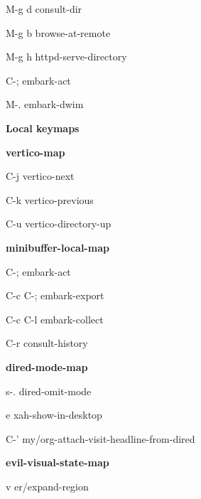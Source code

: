 \documentclass[10pt]{article}
\renewcommand\section[1]{\bigskip\par\textbf{\color{heading}\large#1}\smallskip}
\renewcommand\subsection[1]{\smallskip\par\textbf{\color{heading}#1}}
\begin{document}
\begin{multicols}{4}
\begin{keylist}
    \item[M-g d] consult-dir
    \item[M-g b] browse-at-remote
    \item[M-g h] httpd-serve-directory
    \item[C-;] embark-act
    \item[M-.] embark-dwim
  \end{keylist}

  \section{Local keymaps}
  \subsection{vertico-map}
  \begin{keylist}
    \item[C-j] vertico-next
    \item[C-k] vertico-previous
    \item[C-u] vertico-directory-up
  \end{keylist}
  \subsection{minibuffer-local-map}
  \begin{keylist}
    \item[C-;] embark-act
    \item[C-c C-;] embark-export
    \item[C-c C-l] embark-collect

    \item[C-r] consult-history
  \end{keylist}

  \subsection{dired-mode-map}
  \begin{keylist}
    \item[s-.] dired-omit-mode
    \item[e] xah-show-in-desktop
    \item[C-'] my/org-attach-visit-headline-from-dired
    \end{keylist}

  \subsection{evil-visual-state-map}
  \begin{keylist}
    \item[v] er/expand-region
  \end{keylist}


\end{multicols}
\end{document}
